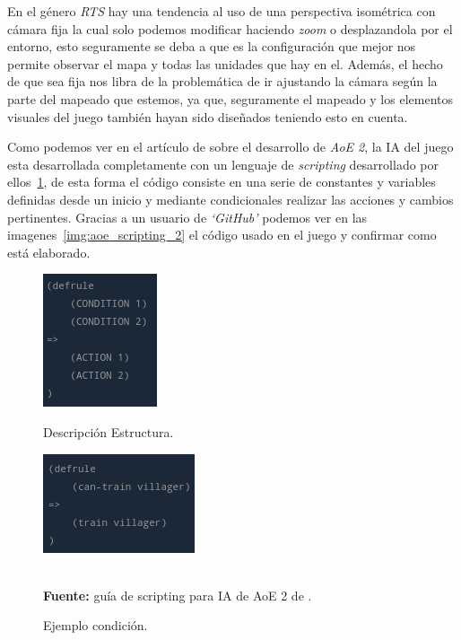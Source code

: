 En el género \textit{\ac{RTS}} hay una tendencia al uso de una perspectiva isométrica con cámara fija
la cual solo podemos modificar haciendo \textit{zoom} o desplazandola por el entorno, esto seguramente
se deba a que es la configuración que mejor nos permite observar el mapa y todas las unidades que
hay en el. Además, el hecho de que sea fija nos libra de la problemática de ir ajustando la
cámara según la parte del mapeado que estemos, ya que, seguramente el mapeado y los elementos
visuales del juego también hayan sido diseñados teniendo esto en cuenta.

Como podemos ver en el artículo de \citeauthor*{Pritchard2000} sobre el desarrollo de \textit{\ac{AoE} 2},
la \ac{IA} del juego esta desarrollada completamente con un lenguaje de \textit{scripting} desarrollado
por ellos~\ref{img:aoe_scripting_1}, de esta forma el código consiste en una serie de constantes y variables definidas desde un
inicio y mediante condicionales realizar las acciones  y cambios pertinentes. Gracias a un usuario
de \textit{`GitHub'} podemos ver en las imagenes~\ref{img:aoe_scripting_2} el código usado en el juego
y confirmar como está elaborado.

\begin{figure}[ht]
\centering
\begin{minipage}[c]{0.45\linewidth}
	\hspace{20mm}
	\includegraphics[height=0.15\textheight]{imagenes/marco_teo/referentes/aoe_scripting_1.png}
	\caption{Descripción Estructura.}
	\label{img:aoe_script_1}
\end{minipage}
\begin{minipage}[c]{0.45\linewidth}
	\hspace{9mm}
	\includegraphics[height=0.15\textheight]{imagenes/marco_teo/referentes/aoe_scripting_2.png}
	\caption{Ejemplo condición.}
	\label{img:aoe_script_2}
\end{minipage}\\[3mm]
\textbf{Fuente:} guía de scripting para \ac{IA} de \ac{AoE} 2 de \citeauthor*{redmechanic2017}.
\label{img:aoe_scripting_1}	
\end{figure}


